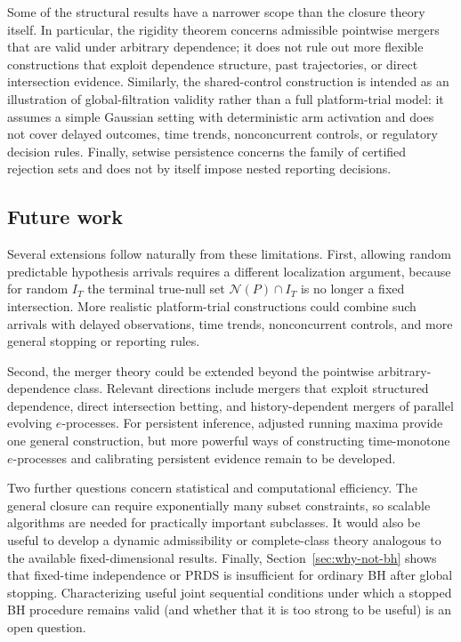 \documentclass[11pt]{article}
\numberwithin{equation}{section}
\theoremstyle{plain}
\theoremstyle{definition}
\newcommand{\calN}{\mathcal N}
\begin{document}
Some of the structural results have a narrower scope than the closure theory itself. In particular, the rigidity theorem concerns admissible pointwise mergers that are valid under arbitrary dependence; it does not rule out more flexible constructions that exploit dependence structure, past trajectories, or direct intersection evidence. Similarly, the shared-control construction is intended as an illustration of global-filtration validity rather than a full platform-trial model: it assumes a simple Gaussian setting with deterministic arm activation and does not cover delayed outcomes, time trends, nonconcurrent controls, or regulatory decision rules. Finally, setwise persistence concerns the family of certified rejection sets and does not by itself impose nested reporting decisions.

\subsection{Future work}\label{sec:future-work}

Several extensions follow naturally from these limitations. First, allowing random predictable hypothesis arrivals requires a different localization argument, because for random $I_T$ the terminal true-null set $\calN(P)\cap I_T$ is no longer a fixed intersection. More realistic platform-trial constructions could combine such arrivals with delayed observations, time trends, nonconcurrent controls, and more general stopping or reporting rules.

Second, the merger theory could be extended beyond the pointwise arbitrary-dependence class. Relevant directions include mergers that exploit structured dependence, direct intersection betting, and history-dependent mergers of parallel evolving $e$-processes. For persistent inference, adjusted running maxima provide one general construction, but more powerful ways of constructing time-monotone $e$-processes and calibrating persistent evidence remain to be developed.

Two further questions concern statistical and computational efficiency. The general closure can require exponentially many subset constraints, so scalable algorithms are needed for practically important subclasses. It would also be useful to develop a dynamic admissibility or complete-class theory analogous to the available fixed-dimensional results. Finally, Section~\ref{sec:why-not-bh} shows that fixed-time independence or PRDS is insufficient for ordinary BH after global stopping. Characterizing useful joint sequential conditions under which a stopped BH procedure remains valid (and whether that it is too strong to be useful) is an open question.
\end{document}

